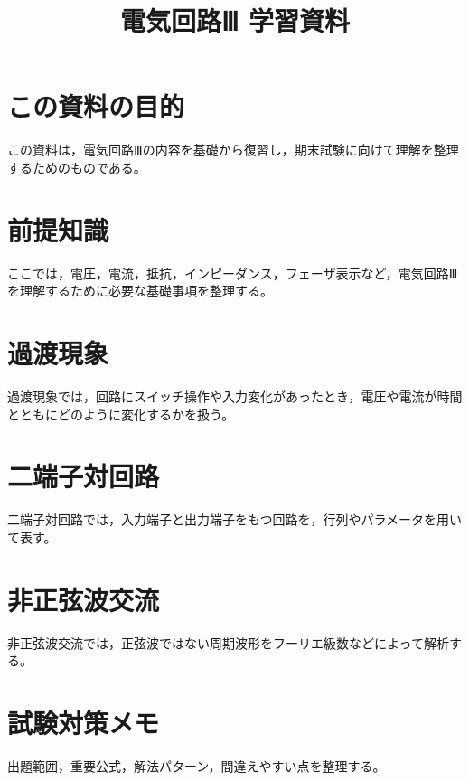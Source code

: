 \documentclass[a4paper,11pt]{jsarticle}
\title{電気回路Ⅲ 学習資料}
\author{}
\date{}
\begin{document}
\maketitle

\section{この資料の目的}

この資料は，電気回路Ⅲの内容を基礎から復習し，期末試験に向けて理解を整理するためのものである。

\section{前提知識}

ここでは，電圧，電流，抵抗，インピーダンス，フェーザ表示など，電気回路Ⅲを理解するために必要な基礎事項を整理する。

\section{過渡現象}

過渡現象では，回路にスイッチ操作や入力変化があったとき，電圧や電流が時間とともにどのように変化するかを扱う。

\section{二端子対回路}

二端子対回路では，入力端子と出力端子をもつ回路を，行列やパラメータを用いて表す。

\section{非正弦波交流}

非正弦波交流では，正弦波ではない周期波形をフーリエ級数などによって解析する。

\section{試験対策メモ}

出題範囲，重要公式，解法パターン，間違えやすい点を整理する。
\end{document}
